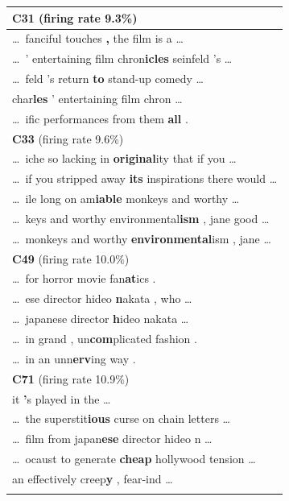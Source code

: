 \begin{longtable}{@{}>{\ttfamily}p{\linewidth}@{}}
    \addlinespace
    {\normalfont\textbf{C31} \hfill (firing rate 9.3\%)}\\
    \cmidrule(){1-1}
    \dots\ fanciful touches\textbf{ ,} the film is a \dots\\
    \dots\ ' entertaining film chron\textbf{icles} seinfeld 's \dots\\
    \dots\ feld 's return\textbf{ to} stand-up comedy \dots\\
    char\textbf{les} ' entertaining film chron \dots\\
    \dots\ ific performances from them\textbf{ all} .\\
    \addlinespace
    {\normalfont\textbf{C33} \hfill (firing rate 9.6\%)}\\
    \cmidrule(){1-1}
    \dots\ iche so lacking in\textbf{ original}ity that if you \dots\\
    \dots\ if you stripped away\textbf{ its} inspirations there would \dots\\
    \dots\ ile long on am\textbf{iable} monkeys and worthy \dots\\
    \dots\ keys and worthy environmental\textbf{ism} , jane good \dots\\
    \dots\ monkeys and worthy\textbf{ environmental}ism , jane \dots\\
    \addlinespace
    {\normalfont\textbf{C49} \hfill (firing rate 10.0\%)}\\
    \cmidrule(){1-1}
    \dots\ for horror movie fan\textbf{at}ics .\\
    \dots\ ese director hideo\textbf{ n}akata , who \dots\\
    \dots\ japanese director\textbf{ h}ideo nakata \dots\\
    \dots\ in grand , un\textbf{com}plicated fashion .\\
    \dots\ in an unn\textbf{erv}ing way .\\
    \addlinespace
    {\normalfont\textbf{C71} \hfill (firing rate 10.9\%)}\\
    \cmidrule(){1-1}
    it\textbf{ '}s played in the \dots\\
    \dots\ the superstit\textbf{ious} curse on chain letters \dots\\
    \dots\ film from japan\textbf{ese} director hideo n \dots\\
    \dots\ ocaust to generate\textbf{ cheap} hollywood tension \dots\\
    an effectively creep\textbf{y} , fear-ind \dots\\
    \addlinespace

\end{longtable}
